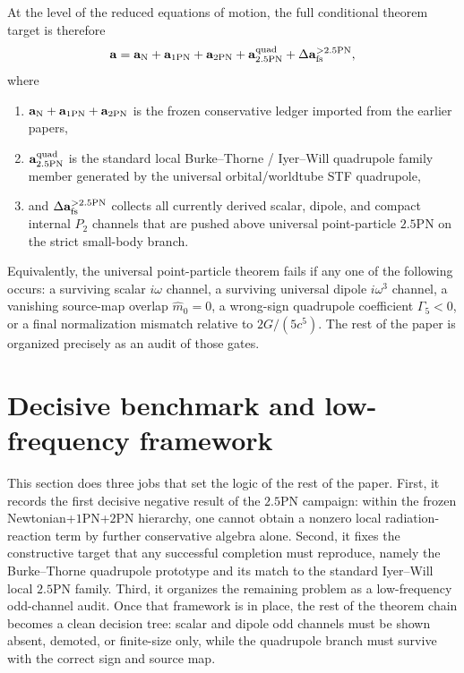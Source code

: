 \documentclass[11pt]{article}
\begin{document}
At the level of the reduced equations of motion, the full conditional theorem target is
therefore
\[
\mathbf a
=
\mathbf a_{\rm N}
+\mathbf a_{1\rm PN}
+\mathbf a_{2\rm PN}
+\mathbf a_{2.5\rm PN}^{\rm quad}
+\Delta\mathbf a_{\rm fs}^{>2.5\rm PN},
\]
where
\begin{enumerate}
  \item $\mathbf a_{\rm N}+\mathbf a_{1\rm PN}+\mathbf a_{2\rm PN}$ is the frozen
  conservative ledger imported from the earlier papers,
  \item $\mathbf a_{2.5\rm PN}^{\rm quad}$ is the standard local
  Burke--Thorne / Iyer--Will quadrupole family member generated by the universal
  orbital/worldtube STF quadrupole,
  \item and $\Delta\mathbf a_{\rm fs}^{>2.5\rm PN}$ collects all currently derived scalar,
  dipole, and compact internal $P_2$ channels that are pushed above universal point-particle
  $2.5$PN on the strict small-body branch.
\end{enumerate}
Equivalently, the universal point-particle theorem fails if any one of the following occurs:
a surviving scalar $i\omega$ channel, a surviving universal dipole $i\omega^3$ channel, a
vanishing source-map overlap $\hat m_0=0$, a wrong-sign quadrupole coefficient
$\Gamma_5<0$, or a final normalization mismatch relative to $2G/(5c^5)$.  The rest of the
paper is organized precisely as an audit of those gates.

\section{Decisive benchmark and low-frequency framework}
\label{sec:benchmark-framework}

This section does three jobs that set the logic of the rest of the paper.
First, it records the first decisive negative result of the $2.5$PN campaign:
within the frozen Newtonian+$1$PN+$2$PN hierarchy, one cannot obtain a
nonzero local radiation-reaction term by further conservative algebra alone.
Second, it fixes the constructive target that any successful completion must
reproduce, namely the Burke--Thorne quadrupole prototype and its match to the
standard Iyer--Will local $2.5$PN family.  Third, it organizes the remaining
problem as a low-frequency odd-channel audit.  Once that framework is in place,
the rest of the theorem chain becomes a clean decision tree: scalar and dipole
odd channels must be shown absent, demoted, or finite-size only, while the
quadrupole branch must survive with the correct sign and source map.
\end{document}
